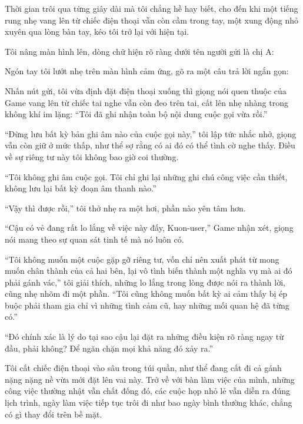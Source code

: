 \documentclass[../main.tex]{subfiles}
\begin{document}
Thời gian trôi qua từng giây dài mà tôi chẳng hề hay biết, cho đến khi một tiếng rung nhẹ vang lên từ chiếc điện thoại vẫn còn cầm trong tay, một xung động nhỏ xuyên qua lòng bàn tay, kéo tôi trở lại với hiện tại.

Tôi nâng màn hình lên, dòng chữ hiện rõ ràng dưới tên người gửi là chị A:


Ngón tay tôi lướt nhẹ trên màn hình cảm ứng, gõ ra một câu trả lời ngắn gọn:


Nhấn nút gửi, tôi vừa định đặt điện thoại xuống thì giọng nói quen thuộc của Game vang lên từ chiếc tai nghe vẫn còn đeo trên tai, cất lên nhẹ nhàng trong không khí im lặng: ``Tôi đã ghi nhận toàn bộ nội dung cuộc gọi vừa rồi.''

``Đừng lưu bất kỳ bản ghi âm nào của cuộc gọi này,'' tôi lập tức nhắc nhở, giọng vẫn còn giữ ở mức thấp, như thể sợ rằng có ai đó có thể tình cờ nghe thấy. Điều về sự riêng tư này tôi không bao giờ coi thường.

``Tôi không ghi âm cuộc gọi. Tôi chỉ ghi lại những ghi chú công việc cần thiết, không lưu lại bất kỳ đoạn âm thanh nào.''

``Vậy thì được rồi,'' tôi thở nhẹ ra một hơi, phần nào yên tâm hơn.

``Cậu có vẻ đang rất lo lắng về việc này đấy, Kuon-user,'' Game nhận xét, giọng nói mang theo sự quan sát tinh tế mà nó luôn có.

``Tôi không muốn một cuộc gặp gỡ riêng tư, vốn chỉ nên xuất phát từ mong muốn chân thành của cả hai bên, lại vô tình biến thành một nghĩa vụ mà ai đó phải gánh vác,'' tôi giải thích, những lo lắng trong lòng được nói ra thành lời, cũng nhẹ nhõm đi một phần. ``Tôi cũng không muốn bất kỳ ai cảm thấy bị ép buộc phải tham gia chỉ vì những tình cảm cũ, hay những mối quan hệ đã từng có.''

``Đó chính xác là lý do tại sao cậu lại đặt ra những điều kiện rõ ràng ngay từ đầu, phải không? Để ngăn chặn mọi khả năng đó xảy ra.''

Tôi cất chiếc điện thoại vào sâu trong túi quần, như thể đang cất đi cả gánh nặng nặng nề vừa mới đặt lên vai này. Trở về với bàn làm việc của mình, những công việc thường nhật vẫn chất đống đó, các cuộc họp nhỏ lẻ vẫn diễn ra đúng lịch trình, ngày làm việc tiếp tục trôi đi như bao ngày bình thường khác, chẳng có gì thay đổi trên bề mặt.
\end{document}
